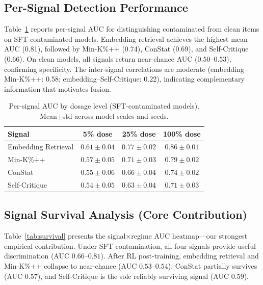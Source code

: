 \documentclass[letterpaper]{article}
\begin{document}
\subsection{Per-Signal Detection Performance}
\label{sec:signals}

Table~\ref{tab:signal_auc} reports per-signal AUC for distinguishing contaminated from clean items on SFT-contaminated models.
Embedding retrieval achieves the highest mean AUC (0.81), followed by Min-K\%++ (0.74), ConStat (0.69), and Self-Critique (0.66).
On clean models, all signals return near-chance AUC ($0.50$--$0.53$), confirming specificity.
The inter-signal correlations are moderate (embedding--Min-K\%++: 0.58; embedding--Self-Critique: 0.22), indicating complementary information that motivates fusion.

\begin{table}[t]
\centering
\caption{Per-signal AUC by dosage level (SFT-contaminated models). Mean$\pm$std across model scales and seeds.}
\label{tab:signal_auc}
\begin{tabular}{lccc}
\toprule
\textbf{Signal} & \textbf{5\% dose} & \textbf{25\% dose} & \textbf{100\% dose} \\
\midrule
Embedding Retrieval & $0.61{\pm}0.04$ & $0.77{\pm}0.02$ & $0.86{\pm}0.01$ \\
Min-K\%++ & $0.57{\pm}0.05$ & $0.71{\pm}0.03$ & $0.79{\pm}0.02$ \\
ConStat & $0.55{\pm}0.06$ & $0.66{\pm}0.04$ & $0.74{\pm}0.02$ \\
Self-Critique & $0.54{\pm}0.05$ & $0.63{\pm}0.04$ & $0.71{\pm}0.03$ \\
\bottomrule
\end{tabular}
\end{table}

\subsection{Signal Survival Analysis (Core Contribution)}
\label{sec:survival}

Table~\ref{tab:survival} presents the signal$\times$regime AUC heatmap---our strongest empirical contribution.
Under SFT contamination, all four signals provide useful discrimination (AUC $0.66$--$0.81$).
After RL post-training, embedding retrieval and Min-K\%++ collapse to near-chance (AUC $0.53$--$0.54$), ConStat partially survives (AUC $0.57$), and Self-Critique is the sole reliably surviving signal (AUC $0.59$).
\end{document}
